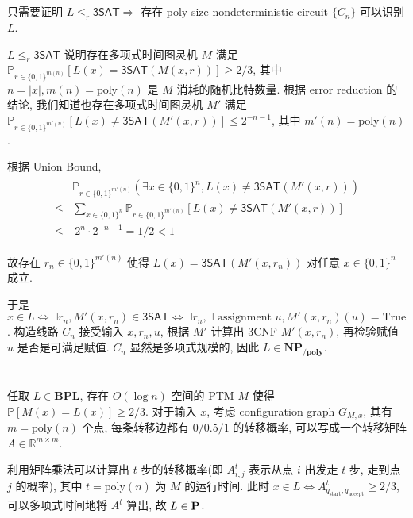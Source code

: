 \documentclass[8pt]{article}
\theoremstyle{compact}
\def\le{\leqslant}
\def\ge{\geqslant}
\begin{document}
\section{}
只需要证明 $L \le_r \textsf{3SAT} \Rightarrow $ 存在 poly-size nondeterministic circuit $\{C_n\}$ 可以识别 $L$.

$L \le_r \textsf{3SAT}$ 说明存在多项式时间图灵机 $M$ 满足 $\mathbb P_{r \in \{0, 1\}^{m(n)}}[L(x) = \textsf{3SAT}(M(x, r))] \ge 2/3$, 其中 $n = |x|, m(n) = \text{poly}(n)$ 是 $M$ 消耗的随机比特数量. 根据 error reduction 的结论, 我们知道也存在多项式时间图灵机 $M'$ 满足 $\mathbb P_{r \in \{0, 1\}^{m'(n)}}[L(x) \neq \textsf{3SAT}(M'(x, r))] \le 2^{-n-1}$, 其中 $m'(n) = \text{poly}(n)$.

根据 Union Bound, \begin{align*}
	\begin{split}
		&\mathbb P_{r \in \{0, 1\}^{m'(n)}} \left(\exists x \in \{0, 1\}^n, L(x) \neq \textsf{3SAT}(M'(x, r))\right) \\
		\le & \sum_{x \in \{0, 1\}^n}\mathbb P_{r \in \{0, 1\}^{m'(n)}}[L(x) \neq \textsf{3SAT}(M'(x, r))] \\
		\le & \ 2^n \cdot 2^{-n-1} = 1/2 < 1
	\end{split}
\end{align*}

故存在 $r_n \in \{0, 1\}^{m'(n)}$ 使得 $L(x) = \textsf{3SAT}(M'(x, r_n))$ 对任意 $x \in \{0, 1\}^n$ 成立.

于是 $x \in L \Leftrightarrow \exists r_n, M'(x, r_n) \in \textsf{3SAT} \Leftrightarrow \exists r_n, \exists \text{ assignment } u, M'(x, r_n)(u) = \text{True}$. 构造线路 $C_n$ 接受输入 $x, r_n, u$, 根据 $M'$ 计算出 3CNF $M'(x, r_n)$, 再检验赋值 $u$ 是否是可满足赋值. $C_n$ 显然是多项式规模的, 因此 $L \in \textbf{NP}_{\textbf{/poly}}$.
\section{}
\def\BPL{\textbf{BPL}}
任取 $L \in \BPL$, 存在 $O(\log n)$ 空间的 PTM $M$ 使得 $\mathbb P[M(x) = L(x)] \ge 2/3$. 对于输入 $x$, 考虑 configuration graph $G_{M, x}$, 其有 $m = \text{poly}(n)$ 个点, 每条转移边都有 $0/0.5/1$ 的转移概率, 可以写成一个转移矩阵 $A \in \mathbb R^{m \times m}$.

利用矩阵乘法可以计算出 $t$ 步的转移概率(即 $A^t_{i, j}$ 表示从点 $i$ 出发走 $t$ 步, 走到点 $j$ 的概率), 其中 $t = \text{poly}(n)$ 为 $M$ 的运行时间. 此时 $x \in L \Leftrightarrow A^t_{q_{\text{start}}, q_{\text{accept}}} \ge 2/3$, 可以多项式时间地将 $A^t$ 算出, 故 $L \in \P$.
\end{document}
